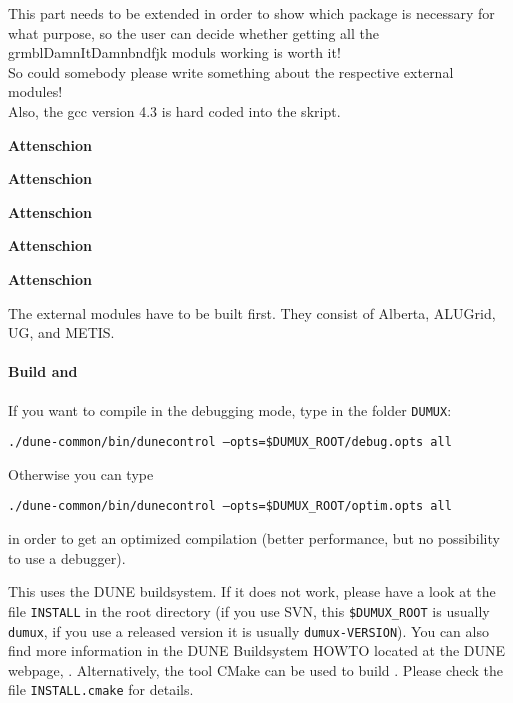 {\it

  This  part needs to be extended in order to show which package is necessary for what purpose, 
  so the user can decide whether getting all the grmblDamnItDamnbndfjk 
  moduls working is worth it! \\

  So could somebody please write something about the respective external modules!\\ 

Also, the gcc version 4.3 is hard coded into the skript. }

\begin{turn}{45}\textbf{Attenschion}\end{turn}
\begin{turn}{45}\textbf{Attenschion}\end{turn}
\begin{turn}{45}\textbf{Attenschion}\end{turn}
\begin{turn}{45}\textbf{Attenschion}\end{turn}
\begin{turn}{45}\textbf{Attenschion}\end{turn}

The external modules have to be built first. They consist of Alberta, ALUGrid, UG, and METIS.

\paragraph{Build \Dune and \Dumux}
\label{buildIt}
If you want to compile in the debugging mode, type in the folder \texttt{DUMUX}: 
\begin{center}
\texttt{./dune-common/bin/dunecontrol --opts=\$DUMUX\_ROOT/debug.opts all}
\end{center}

Otherwise you can type
\begin{center}
\texttt{./dune-common/bin/dunecontrol --opts=\$DUMUX\_ROOT/optim.opts all}
\end{center}
in order to get an optimized compilation (better performance, but no possibility to use a debugger).

This uses the DUNE buildsystem. If it does not work, please have a look at the file \texttt{INSTALL} in the \Dumux root directory (if you use SVN, this \texttt{\$DUMUX\_ROOT} is usually \texttt{dumux}, if you use a released version it is usually \texttt{dumux-VERSION}). You can also find more information in the DUNE Buildsystem HOWTO located at the DUNE webpage, \cite{DUNE-HP}.  Alternatively, the tool CMake can be used to build \Dumux. Please check the file \texttt{INSTALL.cmake} for details.
